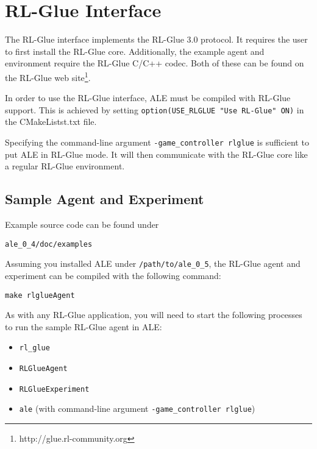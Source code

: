 \documentclass[12pt]{article}
\begin{document}
\section{RL-Glue Interface}\label{sec:rlglue_interface}


The RL-Glue interface implements the RL-Glue 3.0 protocol.
It requires the user to first install the RL-Glue core. Additionally, the example agent and 
environment require the RL-Glue C/C++ codec. Both of these can be found on the RL-Glue web
site\footnote{http://glue.rl-community.org}.

In order to use the RL-Glue interface, ALE must be compiled with RL-Glue support. This is achieved
by setting \verb+option(USE_RLGLUE "Use RL-Glue" ON)+ in the CMakeListst.txt file.

Specifying the command-line argument \verb+-game_controller rlglue+ is sufficient to put ALE in 
RL-Glue mode. It will then communicate with the RL-Glue core like a regular RL-Glue environment.

\subsection{Sample Agent and Experiment}

Example source code can be found under

\begin{verbatim}
ale_0_4/doc/examples
\end{verbatim}

Assuming you installed ALE under \verb+/path/to/ale_0_5+, the RL-Glue agent and experiment
can be compiled with the following command: 

\begin{verbatim}
make rlglueAgent 
\end{verbatim}

As with any RL-Glue application, you will need to start the following processes to run the
sample RL-Glue agent in ALE:

\begin{itemize}
  \item{\verb+rl_glue+} 
  \item{\verb+RLGlueAgent+}
  \item{\verb+RLGlueExperiment+}
  \item{\verb+ale+ (with command-line argument \verb+-game_controller rlglue+)}
\end{itemize}
\end{document}
